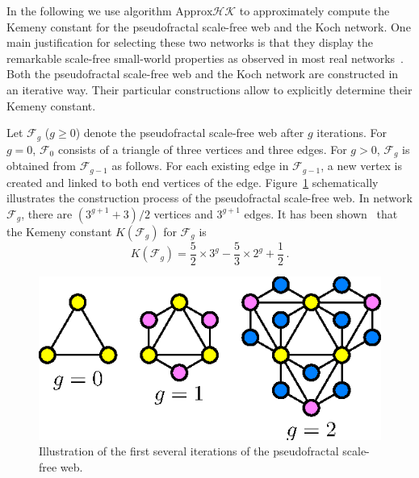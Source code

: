 \documentclass[sigconf]{acmart}
\begin{document}
In the following we use algorithm $\text{Approx}\mathcal{HK}$ to approximately compute the Kemeny constant for the pseudofractal scale-free web and the Koch network. One main justification for selecting these two networks is that they display the remarkable scale-free small-world properties as observed in most real networks~\cite{Ne03}.  Both the pseudofractal scale-free web and the Koch network are constructed in an iterative way. Their particular constructions allow to explicitly determine their Kemeny constant.

Let $\mathcal{F}_g$ ($g \geq 0$) denote the pseudofractal scale-free web after $g$ iterations. For $g=0$, $ \mathcal{F}_0$ consists of a triangle of three vertices and three edges. For $g>0$, $\mathcal{F}_g$ is obtained from $\mathcal{F}_{g-1}$ as follows. For each existing edge in $\mathcal{F}_{g-1}$, a new vertex is created and linked to both end vertices of the edge.  Figure~\ref{psfw1} schematically illustrates the construction process of the pseudofractal scale-free web. In network $\mathcal{F}_g$, there are $(3^{g+1}+3)/2$ vertices and $3^{g+1}$ edges.  It has been shown~\cite{XiZhCo16} that the Kemeny constant $K(\mathcal{F}_g) $ for $\mathcal{F}_g$ is
\begin{equation}\label{Kg01}
	K(\mathcal{F}_g)=\frac{5}{2}\times3^g-\frac{5}{3}\times2^g+\frac{1}{2}\,. %
\end{equation}

\begin{figure}
	\begin{center}
		\includegraphics[width=0.75\linewidth]{Pseudofractal.eps}
		\caption{ Illustration of the first several iterations of the pseudofractal scale-free web. }
		\label{psfw1}
	\end{center}
\end{figure}
\end{document}
